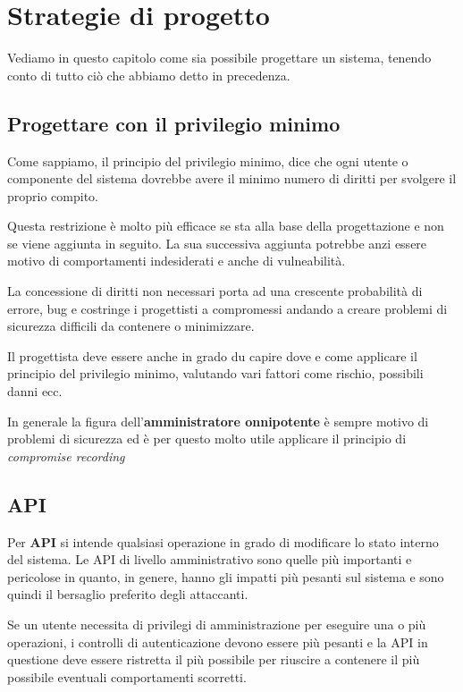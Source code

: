 \chapter{Strategie di progetto}
Vediamo in questo capitolo come sia possibile progettare un sistema, tenendo conto di tutto ciò che abbiamo detto in
precedenza.

\section{Progettare con il privilegio minimo}
Come sappiamo, il principio del privilegio minimo, dice che ogni utente o componente del sistema dovrebbe avere il
minimo numero di diritti per svolgere il proprio compito.

Questa restrizione è molto più efficace se sta alla base della progettazione e non se viene aggiunta in seguito. La
sua successiva aggiunta potrebbe anzi essere motivo di comportamenti indesiderati e anche di vulneabilità.

La concessione di diritti non necessari porta ad una crescente probabilità di errore, bug e costringe i progettisti a
compromessi andando a creare problemi di sicurezza difficili da contenere o minimizzare.

Il progettista deve essere anche in grado du  capire dove e come applicare il principio del privilegio minimo, valutando
vari fattori come rischio, possibili danni ecc.

In generale la figura dell'\textbf{amministratore onnipotente} è sempre motivo di problemi di sicurezza ed è per questo
molto utile applicare il principio di \emph{compromise recording}

\section{API}
Per \textbf{API} si intende qualsiasi operazione in grado di modificare lo stato interno del sistema. Le API di livello
amministrativo sono quelle più importanti e pericolose in quanto, in genere, hanno gli impatti più pesanti sul sistema
e sono quindi il bersaglio preferito degli attaccanti.

Se un utente necessita di privilegi di amministrazione per eseguire una o più operazioni, i controlli di autenticazione
devono essere più pesanti e la API in questione deve essere ristretta il più possibile per riuscire a contenere il
più possibile eventuali comportamenti scorretti.